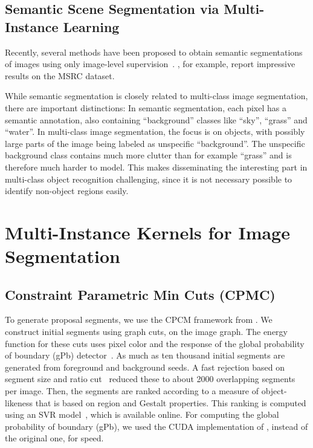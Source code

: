 \documentclass{llncs} %
\begin{document}
\subsection{Semantic Scene Segmentation via Multi-Instance Learning}
Recently, several methods have been proposed to obtain semantic segmentations of images using only
image-level supervision~\citep{vezhnevets2011weakly,verbeek2007region,vezhnevets2010towards}. \citet{vezhnevets2011weakly},
for example, report impressive results on the MSRC dataset.

While semantic segmentation is closely related to multi-class image segmentation, there are important
distinctions: In semantic segmentation, each pixel has a semantic annotation, also containing ``background''
classes like ``sky'', ``grass'' and ``water''. In multi-class image segmentation, the focus is on
objects, with possibly large parts of the image being labeled as unspecific ``background''.
The unspecific background class contains much more clutter than for example ``grass'' and is therefore
much harder to model.
This makes disseminating the interesting part in multi-class object recognition challenging, since it
is not necessary possible to identify non-object regions easily.


\section{Multi-Instance Kernels for Image Segmentation}
\subsection{Constraint Parametric Min Cuts (CPMC)}
To generate proposal segments, we use the CPCM framework from \citet{carreira2010constrained}. We construct initial
segments using graph cuts, on the image graph. The energy function for these cuts uses pixel
color and the response of the global probability of boundary (gPb) detector~\citep{maire2008using}. As much as ten thousand initial segments are generated from foreground
and background seeds. A fast rejection based on segment size and ratio cut~\citep{wang2003image} reduced these to about 2000 overlapping
segments per image. Then, the segments are ranked according to a measure of object-likeness that is based on region and Gestalt properties.
This ranking is computed using an SVR model~\citep{carreira2010constrained}, which is available online.
For computing the global probability of boundary (gPb), we used the CUDA implementation
of \citet{catanzaro2009efficient}, instead of the original one, for speed.
\end{document}
